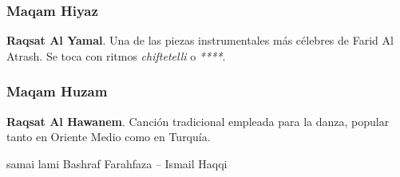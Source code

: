 \subsubsection{Maqam Hiyaz}
\begin{compactitem}
\item \textbf{Raqsat Al Yamal}. Una de las piezas instrumentales más célebres de Farid Al Atrash. Se toca con ritmos \emph{chiftetelli} o \emph{****}.
\end{compactitem}

\subsubsection{Maqam Huzam}
\begin{compactitem}
\item \textbf{Raqsat Al Hawanem}. Canción tradicional empleada para la danza, popular tanto en Oriente Medio como en Turquía.
\end{compactitem}














samai lami %
Bashraf Farahfaza – Ismail Haqqi
%

